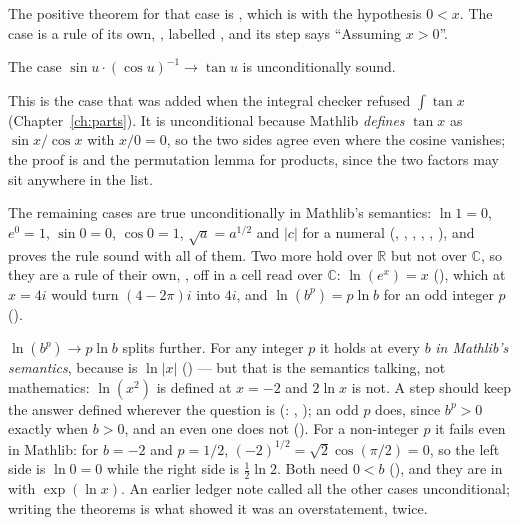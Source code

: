 The positive theorem for that case is , which is 
with the hypothesis $0 < x$. The case is a rule of its own, , labelled
, and its step says ``Assuming $x > 0$''.

\begin{thmbox}
  The case $\sin u \cdot (\cos u)^{-1} \to \tan u$ is unconditionally sound.
\end{thmbox}

This is the case that was added when the integral checker refused $\int \tan x$
(Chapter~\ref{ch:parts}). It is unconditional because Mathlib \emph{defines} $\tan x$ as
$\sin x / \cos x$ with $x/0 = 0$, so the two sides agree even where the cosine vanishes; the
proof is  and the permutation lemma for products, since the two
factors may sit anywhere in the list.

The remaining cases are true unconditionally in Mathlib's semantics: $\ln 1 = 0$, $e^0 = 1$,
$\sin 0 = 0$, $\cos 0 = 1$, $\sqrt a = a^{1/2}$ and $|c|$ for a numeral (,
, , , ,
), and  proves the rule sound with all of them. Two more
hold over $\mathbb{R}$ but not over $\mathbb{C}$, so they are a rule of their own,
, off in a cell read over $\mathbb{C}$: $\ln(e^x) = x$ (),
which at $x = 4i$ would turn $(4 - 2\pi)i$ into $4i$, and $\ln(b^p) = p \ln b$ for an odd integer $p$
().

$\ln(b^p) \to p \ln b$ splits further. For any integer $p$ it holds at every $b$ \emph{in Mathlib's
semantics}, because  is $\ln|x|$ () --- but that is the semantics
talking, not mathematics: $\ln(x^2)$ is defined at $x = -2$ and $2 \ln x$ is not. A step should keep
the answer defined wherever the question is (: , ); an odd $p$
does, since $b^p > 0$ exactly when $b > 0$, and an even one does not (). For
a non-integer $p$ it fails even in Mathlib: for $b = -2$ and $p = 1/2$, $(-2)^{1/2} = \sqrt 2 \cos(\pi/2)
= 0$, so the left side is $\ln 0 = 0$ while the right side is $\frac{1}{2}\ln 2$. Both need $0 < b$
(), and they are in  with $\exp(\ln x)$. An earlier
ledger note called all the other cases unconditional; writing the theorems is what showed it was an
overstatement, twice.

